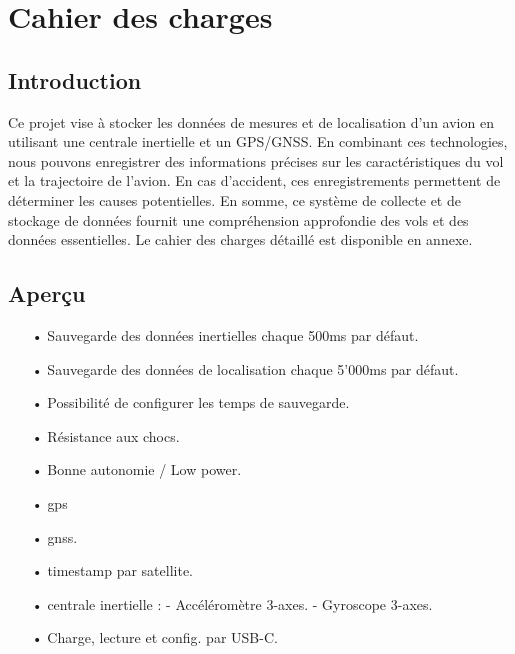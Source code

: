 \section{Cahier des charges}
\noindent
\begin{minipage}[t]{.5\textwidth} %
	\subsection{Introduction}
	Ce projet vise à stocker les données de mesures et de localisation d'un avion en utilisant une centrale inertielle et un GPS/GNSS. En combinant ces technologies, nous pouvons enregistrer des informations précises sur les caractéristiques du vol et la trajectoire de l'avion. En cas d'accident, ces enregistrements permettent de déterminer les causes potentielles. En somme, ce système de collecte et de stockage de données fournit une compréhension approfondie des vols et des données essentielles. Le cahier des charges détaillé est disponible en annexe.
\end{minipage} %
\begin{minipage}[t]{.5\textwidth} %
	\raggedleft
	\subsection{Aperçu}
	\begin{itemize}
		\item[•]	Sauvegarde des données inertielles chaque 500ms par défaut.
		\item[•]	Sauvegarde des données de localisation chaque 5'000ms par défaut.
		\item[•]	Possibilité de configurer les temps de sauvegarde.
		\item[•]	Résistance aux chocs.
		\item[•]	Bonne autonomie / Low power.
		\item[•]	\Gls{gps}
		\item[•]	\Gls{gnss}.
		\item[•]	\gls{timestamp} par satellite.
		\item[•]	\gls{centrale inertielle} :
		\subitem- 	Accéléromètre 3-axes. 
		\subitem-	Gyroscope 3-axes.
		\item[•] Charge, lecture et config. par USB-C.
	\end{itemize}
\end{minipage}

